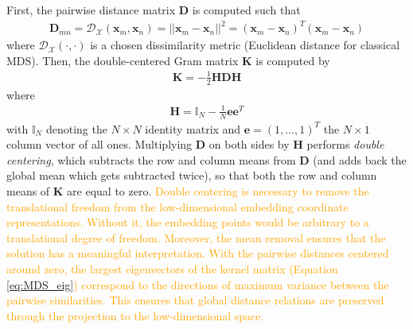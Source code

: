 First, the pairwise distance matrix $\bm{D}$ is computed such that 
\begin{align}
	\bm{D}_{mn} = \mathcal{D}_{\mathcal{X}}(\bm{x}_{m},\bm{x}_{n}) = ||\bm{x}_{m} - \bm{x}_{n} ||^{2} = (\bm{x}_{m} - \bm{x}_{n})^{T}(\bm{x}_{m} - \bm{x}_{n}) 
\end{align}
\noindent
where $\mathcal{D}_{\mathcal{X}}(\cdot,\cdot)$ is a chosen dissimilarity metric (Euclidean distance for classical MDS).  Then, the double-centered Gram matrix $\bm{K}$ is computed by
\begin{align}
	\bm{K}= -\frac{1}{2}\bm{H}\bm{D}\bm{H}
\end{align}
\noindent
where 
\begin{align}
	\bm{H}= \mathbb{I}_{N} - \frac{1}{N}\bm{e}\bm{e}^{T}
\end{align}
\noindent
with $\mathbb{I}_{N}$ denoting the $N \times N$ identity matrix and $\bm{e}= (1, \dots, 1)^{T}$ the $N \times 1$ column vector of all ones.  Multiplying $\bm{D}$ on both sides by $\bm{H}$ performs \textit{double centering}, which subtracts the row and column means from $\bm{D}$ (and adds back the global mean which gets subtracted twice), so that both the row and column means of $\bm{K}$ are equal to zero.  \textcolor{orange}{Double centering is necessary to remove the translational freedom from the low-dimensional embedding coordinate representations.  Without it, the embedding points would be arbitrary to a translational degree of freedom.  Moreover, the mean removal ensures that the solution has a meaningful interpretation.  With the pairwise distances centered around zero, the largest eigenvectors of the kernel matrix (Equation \ref{eq:MDS_eig}) correspond to the directions of maximum variance between the pairwise similarities.  This ensures that global distance relations are preserved through the projection to the low-dimensional space. } 

